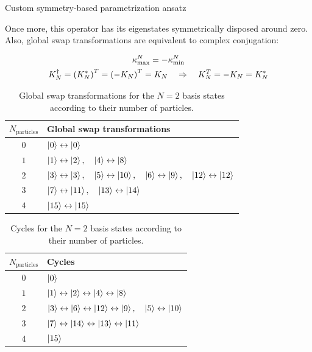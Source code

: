 \documentclass[9pt, handout, aspectratio=169]{beamer}	%
\begin{document}
\begin{frame}[allowframebreaks]{Custom symmetry-based parametrization ansatz}
	\medskip

	Once more, this operator has its eigenstates symmetrically disposed around zero. Also, global swap transformations are equivalent to complex conjugation:

	\begin{gather*}
		\kappa_{\text{max}}^{N} = -\kappa_{\text{min}}^{N} \\
		K_{N}^{\dagger} = \qty(K_{N}^{*})^{T} = \qty(-K_{N})^{T} = K_{N} \quad \Rightarrow \quad
	    K_{N}^{T} = -K_{N} = K_{N}^{*}
	\end{gather*}

\break

	\begin{table}[!bp]
	  \centering
	  \caption{Global swap transformations for the $N=2$ basis states according to their number of particles.}
	  \label{tab:symmetry-ansatz-basis2-swaps}
	  \begin{tabular}{ c l }
	    \hline
	    $N_\text{particles}$ & Global swap transformations \\
	    \hline
	    \hline
	    $0$ & $\ket{0} \leftrightarrow \ket{0}$ \\
	    \hline
	    $1$ & $\ket{1} \lra \ket{2} \qc \ket{4} \lra \ket{8}$ \\
	    \hline
	    $2$ & $\ket{3} \lra \ket{3} \qc \ket{5} \lra \ket{10} \qc
	      \ket{6} \lra \ket{9} \qc \ket{12} \lra \ket{12}$ \\
	    \hline
	    $3$ & $\ket{7} \lra \ket{11} \qc \ket{13} \lra \ket{14}$ \\
	    \hline
	    $4$ & $\ket{15} \leftrightarrow \ket{15}$ \\
	    \hline
	  \end{tabular}
	\end{table}

	\begin{table}[!bp]
	  \centering
	  \caption{Cycles for the $N=2$ basis states according to their number of particles.}
	  \label{tab:symmetry-ansatz-basis2-cycles}
	  \begin{tabular}{ c l }
	    \hline
	    $N_\text{particles}$ & Cycles \\
	    \hline
	    \hline
	    $0$ & $\ket{0}$ \\
	    \hline
	    $1$ & $\ket{1} \leftrightarrow \ket{2} \leftrightarrow \ket{4} \leftrightarrow \ket{8}$ \\
	    \hline
	    $2$ & $\ket{3} \lra \ket{6} \lra \ket{12} \lra \ket{9} \qc
	      \ket{5} \lra \ket{10}$ \\
	    \hline
	    $3$ & $\ket{7} \leftrightarrow \ket{14} \leftrightarrow \ket{13} \leftrightarrow \ket{11}$ \\
	    \hline
	    $4$ & $\ket{15}$ \\
	    \hline
	  \end{tabular}
	\end{table}


\end{frame}
\end{document}
